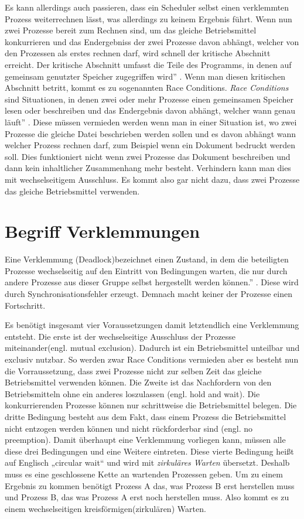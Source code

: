  Es kann allerdings auch passieren, dass ein Scheduler selbst einen verklemmten Prozess weiterrechnen lässt, was allerdings zu keinem Ergebnis führt.
Wenn nun zwei Prozesse bereit zum Rechnen sind, um das gleiche Betriebsmittel konkurrieren und das Endergebniss der zwei Prozesse davon abhängt, welcher von den Prozessen als erstes rechnen darf, wird schnell der kritische Abschnitt erreicht. Der kritische Abschnitt umfasst \glqq die Teile des Programms, in denen auf gemeinsam genutzter Speicher zugegriffen wird'' \parencite[S. 164]{tanenbaum2016}. Wenn man diesen kritischen Abschnitt betritt, kommt es zu sogenannten Race Conditions. \textit{Race Conditions} sind Situationen, \glqq in denen zwei oder mehr Prozesse einen gemeinsamen Speicher lesen oder beschreiben und das Endergebnis davon abhängt, welcher wann genau läuft'' \parencite[S. 166 f.]{tanenbaum2016}. Diese müssen vermieden werden wenn man in einer Situation ist, wo zwei Prozesse die gleiche Datei beschrieben werden sollen und es davon abhängt wann welcher Prozess rechnen darf, zum Beispiel wenn ein Dokument bedruckt werden soll. Dies funktioniert nicht wenn zwei Prozesse das Dokument beschreiben und dann kein inhaltlicher Zusammenhang mehr besteht. Verhindern kann man dies mit wechselseitigem Ausschluss. Es kommt also gar nicht dazu, dass zwei Prozesse das gleiche Betriebsmittel verwenden.

\section{Begriff Verklemmungen}
\glqq Eine Verklemmung (Deadlock)bezeichnet einen Zustand, in dem die beteiligten Prozesse wechselseitig auf den Eintritt von Bedingungen warten, die nur durch andere Prozesse aus dieser Gruppe selbst hergestellt werden können.'' \parencite[S.248]{sturm2001}. Diese wird durch Synchronisationsfehler erzeugt. 
Demnach macht keiner der Prozesse einen Fortschritt.

Es benötigt insgesamt vier Voraussetzungen damit letztendlich eine Verklemmung entsteht. Die erste ist der wechselseitige Ausschluss der Prozesse miteinander(engl. mutual exclusion). Dadurch ist ein Betriebsmittel unteilbar und exclusiv nutzbar. So werden zwar Race Conditions vermieden aber es besteht nun die Vorraussetzung, dass zwei Prozesse nicht zur selben Zeit das gleiche Betriebsmittel verwenden können. Die Zweite ist das Nachfordern von den Betriebsmitteln ohne ein anderes loszulassen (engl. hold and wait). Die konkurrierenden Prozesse können nur schrittweise die Betriebsmittel belegen. Die dritte Bedingung besteht aus dem Fakt, dass einem Prozess die Betriebsmittel nicht entzogen werden können und nicht rückforderbar sind (engl. no preemption). Damit überhaupt eine Verklemmung vorliegen kann, müssen alle diese drei Bedingungen und eine Weitere eintreten. Diese vierte Bedingung heißt auf Englisch „circular wait“ und wird mit \textit{zirkuläres Warten} übersetzt. Deshalb muss es eine geschlossene Kette an wartenden Prozessen geben. Um zu einem Ergebnis zu kommen benötigt Prozess A das, was Prozess B erst herstellen muss und Prozess B, das was Prozess A erst noch herstellen muss. Also kommt es zu einem wechselseitigen kreisförmigen(zirkulären) Warten\parencite[vgl.][S. 195f.]{baun2017}.


